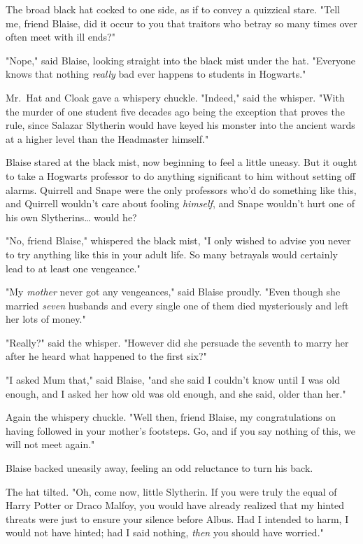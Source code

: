 The broad black hat cocked to one side, as if to convey a quizzical stare. 
"Tell me, friend Blaise, did it occur to you that traitors who betray so many 
times over often meet with ill ends?"

"Nope," said Blaise, looking straight into the black mist under the hat. 
"Everyone knows that nothing \emph{really} bad ever happens to students in 
Hogwarts."

Mr.~Hat and Cloak gave a whispery chuckle. "Indeed," said the whisper. "With 
the murder of one student five decades ago being the exception that proves the 
rule, since Salazar Slytherin would have keyed his monster into the ancient 
wards at a higher level than the Headmaster himself."

Blaise stared at the black mist, now beginning to feel a little uneasy. But it 
ought to take a Hogwarts professor to do anything significant to him without 
setting off alarms. Quirrell and Snape were the only professors who'd do 
something like this, and Quirrell wouldn't care about fooling \emph{himself}, 
and Snape wouldn't hurt one of his own Slytherins{\ldots} would he?

"No, friend Blaise," whispered the black mist, "I only wished to advise you 
never to try anything like this in your adult life. So many betrayals would 
certainly lead to at least one vengeance."

"My \emph{mother} never got any vengeances," said Blaise proudly. "Even though 
she married \emph{seven} husbands and every single one of them died 
mysteriously and left her lots of money."

"Really?" said the whisper. "However did she persuade the seventh to marry her 
after he heard what happened to the first six?"

"I asked Mum that," said Blaise, "and she said I couldn't know until I was old 
enough, and I asked her how old was old enough, and she said, older than her."

Again the whispery chuckle. "Well then, friend Blaise, my congratulations on 
having followed in your mother's footsteps. Go, and if you say nothing of this, 
we will not meet again."

Blaise backed uneasily away, feeling an odd reluctance to turn his back.

The hat tilted. "Oh, come now, little Slytherin. If you were truly the equal of 
Harry Potter or Draco Malfoy, you would have already realized that my hinted 
threats were just to ensure your silence before Albus. Had I intended to harm, 
I would not have hinted; had I said nothing, \emph{then} you should have 
worried."


